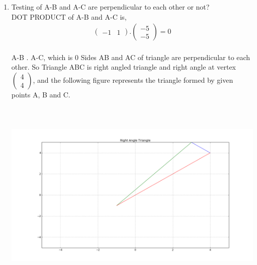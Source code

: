 \documentclass[journal,12pt,twocolumn]{IEEEtran}
\newcommand{\myvec}[1]{\ensuremath{\begin{pmatrix}#1\end{pmatrix}}}
\begin{document}
\begin{enumerate}
\item Testing of  A-B and A-C are perpendicular to each other or not?\\
DOT PRODUCT of  A-B and A-C is, \begin{align} \myvec{ -1 & 1 } . \myvec{ -5 \\ -5 } = 0\end{align}\\
A-B . A-C, which is 0 
Sides AB and AC of triangle are perpendicular to each other. So Triangle ABC is right angled triangle and right angle at vertex \myvec{ 4 \\ 4 }, and the following figure represents the triangle formed by given points A, B and C.  
\includegraphics[width=15cm, height=10cm]{vihi}
\end{enumerate}
\end{document}
